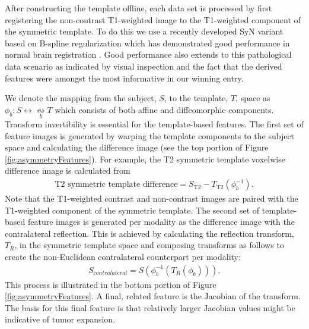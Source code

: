 \documentclass[preprint,authoryear,review,12pt]{elsarticle}
\begin{document}

After constructing the template offline, each data set is processed
by first registering the non-contrast T1-weighted image to the T1-weighted
component of the symmetric template.  To do this we use a recently developed 
SyN \citep{avants2011a} variant based on B-spline regularization 
which has demonstrated good performance in normal brain registration \citep{tustison2013a}.
Good performance also extends to this pathological data scenario as 
indicated by visual inspection and the fact that the derived features
were amongst the most informative in our winning entry.

We denote the mapping from the subject, $S$, to the template, $T$,
space as $\phi_b: S \leftrightarrow \underset{b}{\leftrightsquigarrow}  T$
which consists of both affine and diffeomorphic components.  Transform
invertibility is essential for the template-based features.  The first 
set of feature images is generated by warping the template components 
to the subject space and calculating the difference image (see the 
top portion of Figure \ref{fig:asymmetryFeatures}).  For example,
the T2 symmetric template voxelwise difference image is calculated from
\begin{align}
  \mathrm{T2}\,\,\mathrm{symmetric}\,\,\mathrm{template}\,\,\mathrm{difference} = S_{\mathrm{T2}} - T_{\mathrm{T2}}\left(\phi_b^{-1}\right).
\end{align}
Note that the T1-weighted contrast and non-contrast images are paired with
the T1-weighted component of the symmetric template.  The second
set of template-based feature images is generated per modality 
as the difference image with the contralateral reflection.  This is achieved by calculating the 
reflection transform, $T_R$, in the symmetric template space and composing transforms
as follows to create the non-Euclidean contralateral counterpart per modality:
\begin{align}
  S_{contralateral} = S\left( \phi_b^{-1}\left( T_R\left( \phi_b \right)\right)\right).
\end{align}
This process is illustrated in the bottom portion of Figure \ref{fig:asymmetryFeatures}. A final, related feature is the Jacobian
of the transform.  The basis for this final feature is that 
relatively larger Jacobian values might be indicative of tumor
expansion.
\end{document}
